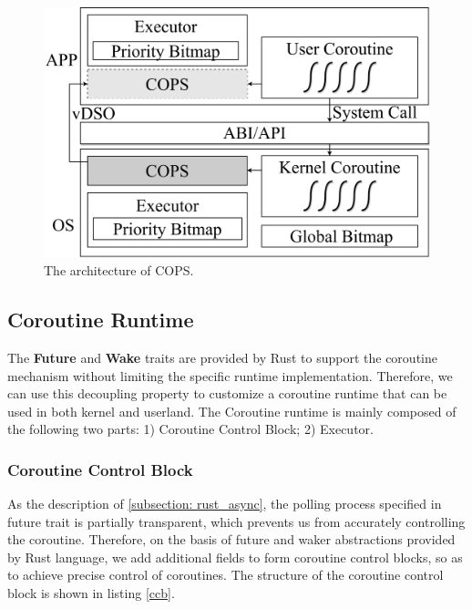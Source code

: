 \documentclass[sigconf,review,anonymous]{acmart}
\begin{document}
\begin{figure}[h]
  \centering
  \includegraphics[width=\linewidth]{assets/arch.pdf}
  \caption{The architecture of COPS.}
  \label{fig:arch}
\end{figure}

\subsection{Coroutine Runtime}
\label{section: Coroutine Runtime}

The \textbf{Future} and \textbf{Wake} traits are provided by Rust to support the coroutine mechanism without limiting the specific runtime implementation. Therefore, we can use this decoupling property to customize a coroutine runtime that can be used in both kernel and userland. The Coroutine runtime is mainly composed of the following two parts: 1) Coroutine Control Block; 2) Executor.

\subsubsection{Coroutine Control Block}

As the description of \ref{subsection: rust_async}, the polling process specified in future trait is partially transparent, which prevents us from accurately controlling the coroutine. Therefore, on the basis of future and waker abstractions provided by Rust language, we add additional fields to form coroutine control blocks, so as to achieve precise control of coroutines. The structure of the coroutine control block is shown in listing \ref{ccb}.
\end{document}
